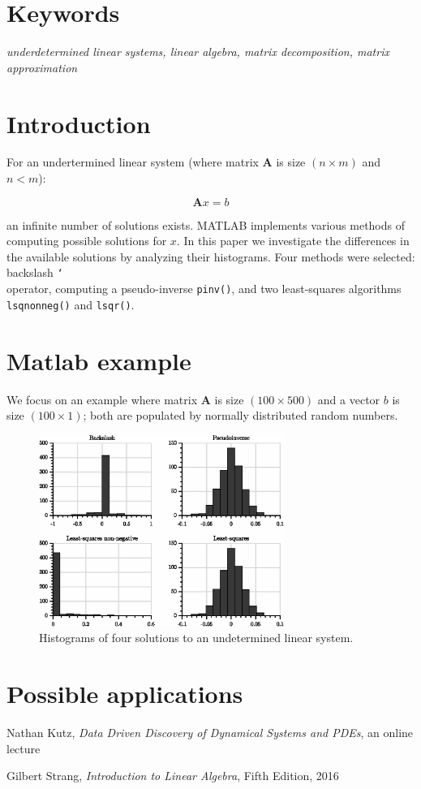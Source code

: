 \documentclass[10pt,twocolumn]{article}
\begin{document}
\section*{Keywords}

\textit{underdetermined linear systems, linear algebra, matrix decomposition, matrix approximation}

\tableofcontents

\section{Introduction}

For an undertermined linear system (where matrix $\bm{A}$ is size $(n \times m)$ and $n<m$):

\begin{equation}
\bm{A} x = b
\end{equation}


an infinite number of solutions exists. MATLAB implements various methods of computing possible solutions for $x$. In this paper we investigate the differences in the available solutions by analyzing their histograms. Four methods were selected: backslash \texttt{\char`\\} operator, computing a pseudo-inverse \texttt{pinv()}, and two least-squares algorithms \texttt{lsqnonneg()} and \texttt{lsqr()}.

\section{Matlab example}

We focus on an example where matrix $\bm{A}$ is size $(100 \times 500)$ and a vector $b$ is size $(100 \times 1)$; both are populated by normally distributed random numbers.

\begin{figure}[H]
\centering\includegraphics[width=8cm]{DWGs/histograms.eps}
\caption{Histograms of four solutions to an undetermined linear system.}			
\label{fig:histograms}
\end{figure}







\section{Possible applications}


\newpage


\thebibliography{}

 Nathan Kutz, \textit{Data Driven Discovery of Dynamical Systems and PDEs}, an online lecture 

 Gilbert Strang, \textit{Introduction to Linear Algebra}, Fifth Edition, 2016

 \label{bib:pope}
\end{document}
